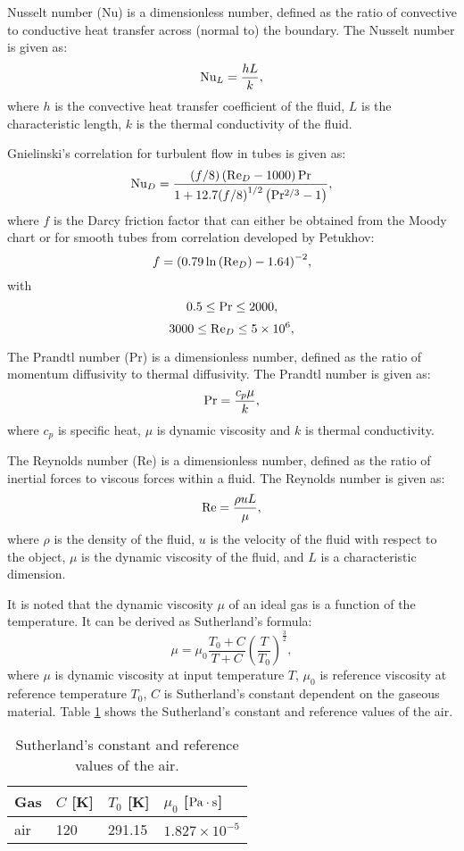 Nusselt number (Nu) is a dimensionless number, defined as the ratio of convective to conductive heat transfer across (normal to) the boundary.
The Nusselt number is given as:
\[{\rm{N}}{{\rm{u}}_L} = \frac{{hL}}{k},\]
where $h$ is the convective heat transfer coefficient of the fluid, $L$ is the characteristic length, $k$ is the thermal conductivity of the fluid.

Gnielinski's correlation for turbulent flow in tubes is given as:
\[{\rm{N}}{{\rm{u}}_D} = \frac{{\left( {f/8} \right)\left( {{\rm{R}}{{\rm{e}}_D} - 1000} \right){\rm{Pr}}}}{{1 + 12.7{{(f/8)}^{1/2}}\left( {{\rm{P}}{{\rm{r}}^{2/3}} - 1} \right)}},\]
where $f$ is the Darcy friction factor that can either be obtained from the Moody chart or for smooth tubes from correlation developed by Petukhov:
\[f = {\left( {0.79\ln \left( {{\rm{R}}{{\rm{e}}_D}} \right) - 1.64} \right)^{ - 2}},\]
with
\[0.5 \le {\rm{Pr}} \le 2000,\]
\[3000 \le {\rm{R}}{{\rm{e}}_D} \le 5 \times {10^6},\]

The Prandtl number (Pr) is a dimensionless number, defined as the ratio of momentum diffusivity to thermal diffusivity.
The Prandtl number is given as:
\[{\rm{Pr}} = \frac{{{c_p}\mu }}{k},\]
where
$c_{p}$ is specific heat, $\mu$ is dynamic viscosity and $k$ is thermal conductivity.

The Reynolds number (Re) is a dimensionless number, defined as the ratio of inertial forces to viscous forces within a fluid.
The Reynolds number is given as:
\[{\rm{Re}} = \frac{{\rho uL}}{\mu },\]
where
$\rho$ is the density of the fluid, $u$ is the velocity of the fluid with respect to the object, $\mu$ is the dynamic viscosity of the fluid, and $L$ is a characteristic dimension.

It is noted that the dynamic viscosity $\mu$ of an ideal gas is a function of the temperature. It can be derived as Sutherland's formula:
\[\mu  = {\mu _0}\frac{{{T_0} + C}}{{T + C}}{\left( {\frac{T}{{{T_0}}}} \right)^{\frac{3}{2}}},\]
where $\mu$ is dynamic viscosity at input temperature $T$,
$\mu_0$ is reference viscosity at reference temperature $T_0$,
$C$ is Sutherland's constant dependent on the gaseous material.
Table \ref{tab:SutherlandConstant} shows the Sutherland's constant and reference values of the air.
\begin{table}[htbp]
  \centering
  \caption{Sutherland's constant and reference values of the air.}
    \begin{tabular}{p{2cm}p{2cm}p{2cm}p{3cm}}
    \toprule
    Gas   & $C$ [K] & $T_0$ [K] & $\mu_0$ [$\rm{Pa\cdot s}$] \\
    \midrule
    air   & 120   & 291.15 & $1.827\times 10^{-5}$ \\
    \bottomrule
    \end{tabular}%
  \label{tab:SutherlandConstant}%
\end{table}%

